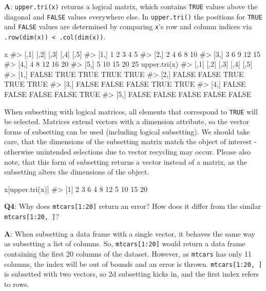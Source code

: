 \documentclass[
]{krantz}
\makeatletter
\newenvironment{Shaded}{\begin{snugshade}}{\end{snugshade}}
\newcommand{\CommentTok}[1]{\textcolor[rgb]{0.56,0.35,0.01}{\textit{#1}}}
\newcommand{\KeywordTok}[1]{\textcolor[rgb]{0.13,0.29,0.53}{\textbf{#1}}}
\newcommand{\NormalTok}[1]{#1}
\newenvironment{kframe}{%
\medskip{}
\setlength{\fboxsep}{.8em}
 \def\at@end@of@kframe{}%
 \ifinner\ifhmode%
  \def\at@end@of@kframe{\end{minipage}}%
  \begin{minipage}{\columnwidth}%
 \fi\fi%
 \def\FrameCommand##1{\hskip\@totalleftmargin \hskip-\fboxsep
 \colorbox{shadecolor}{##1}\hskip-\fboxsep
     \hskip-\linewidth \hskip-\@totalleftmargin \hskip\columnwidth}%
 \MakeFramed {\advance\hsize-\width
   \@totalleftmargin\z@ \linewidth\hsize
   \@setminipage}}%
 {\par\unskip\endMakeFramed%
 \at@end@of@kframe}
\renewenvironment{Shaded}{\begin{kframe}}{\end{kframe}}
\renewcommand{\KeywordTok} [1]{\textcolor[rgb]{0.00,0.44,0.13}{{#1}}}
\renewcommand{\CommentTok} [1]{\textcolor[rgb]{0.38,0.63,0.69}{{#1}}}
\renewcommand{\NormalTok}  [1]{{#1}}
\makeatother
\begin{document}
\textbf{{A}}: \texttt{upper.tri(x)} returns a logical matrix, which contains \texttt{TRUE} values above the diagonal and \texttt{FALSE} values everywhere else. In \texttt{upper.tri()} the positions for \texttt{TRUE} and \texttt{FALSE} values are determined by comparing \texttt{x}'s row and column indices via \texttt{.row(dim(x))\ \textless{}\ .col(dim(x))}.

\begin{Shaded}
\begin{Highlighting}[]
\NormalTok{x}
\CommentTok{#>      [,1] [,2] [,3] [,4] [,5]}
\CommentTok{#> [1,]    1    2    3    4    5}
\CommentTok{#> [2,]    2    4    6    8   10}
\CommentTok{#> [3,]    3    6    9   12   15}
\CommentTok{#> [4,]    4    8   12   16   20}
\CommentTok{#> [5,]    5   10   15   20   25}
\KeywordTok{upper.tri}\NormalTok{(x)}
\CommentTok{#>       [,1]  [,2]  [,3]  [,4]  [,5]}
\CommentTok{#> [1,] FALSE  TRUE  TRUE  TRUE  TRUE}
\CommentTok{#> [2,] FALSE FALSE  TRUE  TRUE  TRUE}
\CommentTok{#> [3,] FALSE FALSE FALSE  TRUE  TRUE}
\CommentTok{#> [4,] FALSE FALSE FALSE FALSE  TRUE}
\CommentTok{#> [5,] FALSE FALSE FALSE FALSE FALSE}
\end{Highlighting}
\end{Shaded}

When subsetting with logical matrices, all elements that correspond to \texttt{TRUE} will be selected. Matrices extend vectors with a dimension attribute, so the vector forms of subsetting can be used (including logical subsetting). We should take care, that the dimensions of the subsetting matrix match the object of interest - otherwise unintended selections due to vector recycling may occur. Please also note, that this form of subsetting returns a vector instead of a matrix, as the subsetting alters the dimensions of the object.

\begin{Shaded}
\begin{Highlighting}[]
\NormalTok{x[}\KeywordTok{upper.tri}\NormalTok{(x)]}
\CommentTok{#>  [1]  2  3  6  4  8 12  5 10 15 20}
\end{Highlighting}
\end{Shaded}

\textbf{{Q4}}: Why does \texttt{mtcars{[}1:20{]}} return an error? How does it differ from the similar \texttt{mtcars{[}1:20,\ {]}}?

\textbf{{A}}: When subsetting a data frame with a single vector, it behaves the same way as subsetting a list of columns. So, \texttt{mtcars{[}1:20{]}} would return a data frame containing the first 20 columns of the dataset. However, as \texttt{mtcars} has only 11 columns, the index will be out of bounds and an error is thrown. \texttt{mtcars{[}1:20,\ {]}} is subsetted with two vectors, so 2d subsetting kicks in, and the first index refers to rows.
\end{document}
